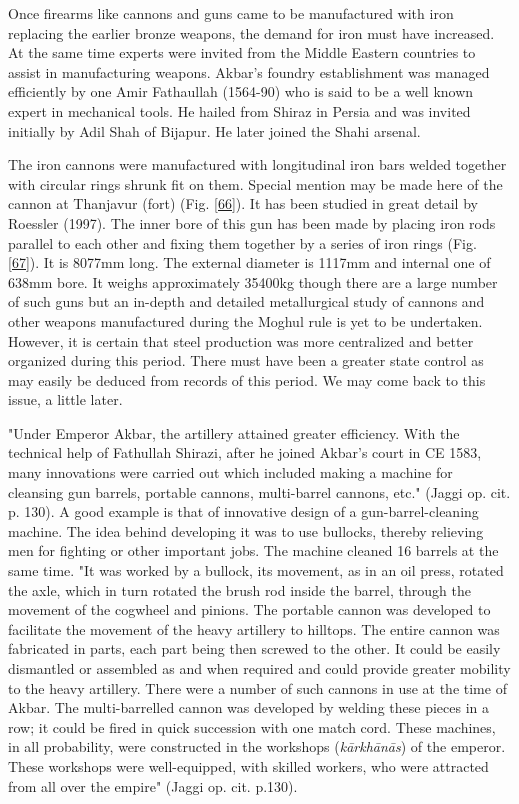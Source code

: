 Once firearms like cannons and guns came to be manufactured with iron replacing the earlier bronze weapons, the demand for iron must have increased. At the same time experts were invited from the Middle Eastern countries to assist in manufacturing weapons. Akbar’s foundry establishment was managed efficiently by one Amir Fathaullah (1564-90) who is said to be a well known expert in mechanical tools. He hailed from Shiraz in Persia and was invited initially by Adil Shah of Bijapur. He later joined the Shahi arsenal.

The iron cannons were manufactured with longitudinal iron bars welded together with circular rings shrunk fit on them. Special mention may be made here of the cannon at Thanjavur (fort) (Fig. \ref{66}). It has been studied in great detail by Roessler (1997). The inner bore of this gun has been made by placing iron rods parallel to each other and fixing them together by a series of iron rings (Fig. \ref{67}). It is 8077mm long. The external diameter is 1117mm and internal one of 638mm bore. It weighs approximately 35400kg though there are a large number of such guns but an in-depth and detailed metallurgical study of cannons and other weapons manufactured during the Moghul rule is yet to be undertaken. However, it is certain that steel production was more centralized and better organized during this period. There must have been a greater state control as may easily be deduced from records of this period. We may come back to this issue, a little later.

"Under Emperor Akbar, the artillery attained greater efficiency. With the technical help of Fathullah Shirazi, after he joined Akbar's court in CE 1583, many innovations were carried out which included making a machine for cleansing gun barrels, portable cannons, multi-barrel cannons, etc." (Jaggi op. cit. p. 130). A good example is that of innovative design of a gun-barrel-cleaning machine. The idea behind developing it was to use bullocks, thereby relieving men for fighting or other important jobs. The machine cleaned 16 barrels at the same time. "It was worked by a bullock, its movement, as in an oil press, rotated the axle, which in turn rotated the brush rod inside the barrel, through the movement of the cogwheel and pinions. The portable cannon was developed to facilitate the movement of the heavy artillery to hilltops. The entire cannon was fabricated in parts, each part being then screwed to the other. It could be easily dismantled or assembled as and when required and could provide greater mobility to the heavy artillery. There were a number of such cannons in use at the time of Akbar. The multi-barrelled cannon was developed by welding these pieces in a row; it could be fired in quick succession with one match cord. These machines, in all probability, were constructed in the workshops ({\it kārkhānās}) of the emperor. These workshops were well-equipped, with skilled workers, who were attracted from all over the empire" (Jaggi op. cit. p.130).

